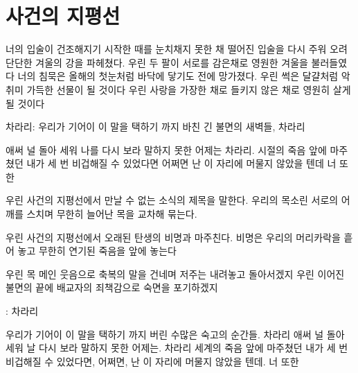 \hypertarget{uxc0acuxac74uxc758-uxc9c0uxd3c9uxc120}{%

\chapter{사건의 지평선}\label{uxc0acuxac74uxc758-uxc9c0uxd3c9uxc120}}



너의 입술이 건조해지기 시작한 때를 눈치채지 못한 채 떨어진 입술을 다시 주워 오려 단단한 겨울의 강을 파헤쳤다. 우린 두 팔이 서로를 감은채로 영원한 겨울을 불러들였다 너의 침묵은 올해의 첫눈처럼 바닥에 닿기도 전에 망가졌다. 우린 썩은 달걀처럼 악취미 가득한 선물이 될 것이다 우린 사랑을 가장한 채로 들키지 않은 채로 영원히 살게 될 것이다



차라리: 우리가 기어이 이 말을 택하기 까지 바친 긴 불면의 새벽들, 차라리



애써 널 돌아 세워 나를 다시 보라 말하지 못한 어제는 차라리. 시절의 죽음 앞에 마주쳤던 내가 세 번 비겁해질 수 있었다면 어쩌면 난 이 자리에 머물지 않았을 텐데 너 또한



우린 사건의 지평선에서 만날 수 없는 소식의 제목을 말한다. 우리의 목소린 서로의 어깨를 스치며 무한히 늘어난 목을 교차해 묶는다.



우린 사건의 지평선에서 오래된 탄생의 비명과 마주친다. 비명은 우리의 머리카락을 흩어 놓고 무한히 연기된 죽음을 앞에 놓는다



우린 목 메인 웃음으로 축복의 말을 건네며 저주는 내려놓고 돌아서겠지 우린 이어진 불면의 끝에 배교자의 죄책감으로 숙면을 포기하겠지



: 차라리



우리가 기어이 이 말을 택하기 까지 버린 수많은 숙고의 순간들. 차라리 애써 널 돌아 세워 날 다시 보라 말하지 못한 어제는. 차라리 세계의 죽음 앞에 마주쳤던 내가 세 번 비겁해질 수 있었다면, 어쩌면, 난 이 자리에 머물지 않았을 텐데. 너 또한

